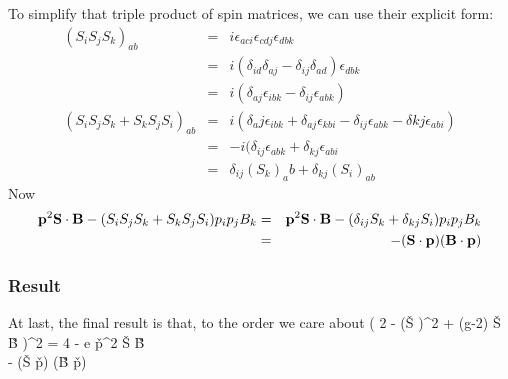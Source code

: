 To simplify that triple product of spin matrices, we can use their explicit form:
\begin{eqnarray*}
	(S_i S_j S_k )_{ab}
		&=&	i\epsilon_{aci}\epsilon_{cdj}\epsilon_{dbk}	\\
		&=&	i(\delta_{id} \delta_{aj} - \delta_{ij} \delta_{ad})\epsilon_{dbk}	\\
		&=&	i(\delta_{aj} \epsilon_{ibk} - \delta_{ij} \epsilon_{abk})		\\
	(S_i S_j S_k + S_k S_j S_i)_{ab}
		&=& i(\delta_aj \epsilon_{ibk} + \delta_{aj} \epsilon_{kbi} -\delta_{ij} \epsilon_{abk} -\delta{kj}\epsilon_{abi})	\\
		&=& -i(\delta_{ij} \epsilon_{abk} + \delta_{kj} \epsilon_{abi}	\\
		&=&	\delta_{ij} {(S_k)}_ab + \delta_{kj} {(S_i)}_{ab}	
\end{eqnarray*}
Now 
\begin{eqnarray*}
 \mathbf{p}^2 \mathbf{S} \cdot \mathbf{B} - (S_i S_j S_k + S_k S_j S_i) p_i p_j B_k
 	&=& \mathbf{p}^2 \mathbf{S} \cdot \mathbf{B} - (\delta_{ij} S_k + \delta_{kj} S_i	) p_i p_j B_k	\\
 	&=& - (\mathbf{S} \cdot \mathbf{p}) (\mathbf{B} \cdot \mathbf{p})
\end{eqnarray*}
\subsubsection*{Result}
At last, the final result is that, to the order we care about 
\beq \label{eq:A:crossterm}
	\left(   {2} -  (\v{S} \cdot \gv{\pi})^2 + (g-2) \v{S} \cdot \v{B} \right )^2 
	=	 {4}  -  e \v{p}^2  \v{S} \cdot \v{B} \\
		 - (\v{S} \cdot \v{p}) (\v{B} \cdot \v{p})
\eeq

